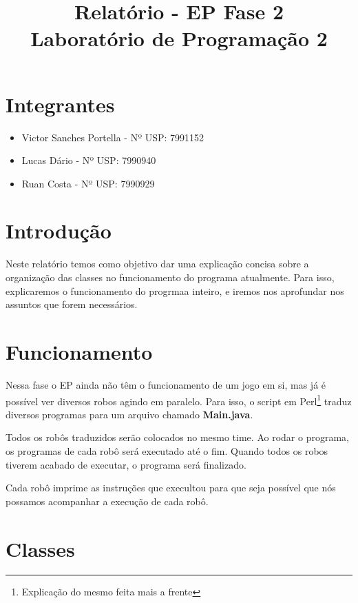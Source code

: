 \documentclass[11pt]{article}
\title{Relatório - EP Fase 2 \\ Laboratório de Programação 2}
\begin{document}
\maketitle

\section{Integrantes}

\begin{itemize}

\item Victor Sanches Portella - Nº USP: 7991152

\item Lucas Dário - Nº USP: 7990940

\item Ruan Costa - Nº USP: 7990929

\end{itemize}

\section{Introdução}

Neste relatório temos como objetivo dar uma explicação concisa sobre a organização das classes no funcionamento do programa atualmente. Para isso, explicaremos o funcionamento do progrmaa inteiro, e iremos nos aprofundar nos assuntos que forem necessários.


\section{Funcionamento}

Nessa fase o EP ainda não têm o funcionamento de um jogo em si, mas já é possível ver diversos robos agindo em paralelo. Para isso, o script em Perl\footnote{Explicação do mesmo feita mais a frente} traduz diversos programas para um arquivo chamado \textbf{\color{red}Main.java}. 

Todos os robôs traduzidos serão colocados no mesmo time. Ao rodar o programa, os programas de cada robô será executado até o fim. Quando todos os robos tiverem acabado de executar, o programa será finalizado.

Cada robô imprime as instruções que execultou para que seja possível que nós possamos acompanhar a execução de cada robô.

\section{Classes}
\end{document}
